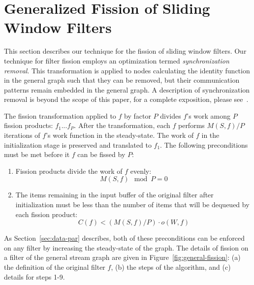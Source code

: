 \section{Generalized Fission of Sliding Window Filters}
\label{sec:fission}

This section describes our technique for the fission of sliding window
filters. Our technique for filter fission employs an optimization
termed {\it synchronization removal}.  This transformation is applied
to nodes calculating the identity function in the general graph such
that they can be removed, but their communication patterns remain
embedded in the general graph. A description of synchronization
removal is beyond the scope of this paper, for a complete exposition,
please see~\cite{mgordon-phd}.

The fission transformation applied to $f$ by factor $P$ divides $f$'s
work among $P$ fission products: $f_1...f_P$.  After the
transformation, each $f$ performs $M(S,f) /P$ iterations of $f$'s work
function in the steady-state.  The work of $f$ in the initialization
stage is preserved and translated to $f_1$.  The following
preconditions must be met before it $f$ can be fissed by $P$:
\begin{enumerate}
\item Fission products divide the work of $f$ evenly:
{\ninepoint
\begin{equation}
M(S,f) \mod P = 0 
\label{eq:mod-fiss}
\end{equation}
}
\item The items remaining in the input buffer of the original filter
  after initialization must be less than the number of items that will
  be dequeued by each fission product:
{\ninepoint
\begin{equation}
C(f) < (M(S,f) / P) \cdot o(W, f)
\label{eq:fiss-precond1}
\end{equation}
}
\end{enumerate}

\noindent As Section~\ref{sec:data-par} describes, both of these
preconditions can be enforced on any filter by increasing the
steady-state of the graph. The details of fission on a filter of the
general stream graph are given in Figure~\ref{fig:general-fission}:
(a) the definition of the original filter $f$, (b) the steps of the
algorithm, and (c) details for steps 1-9.

